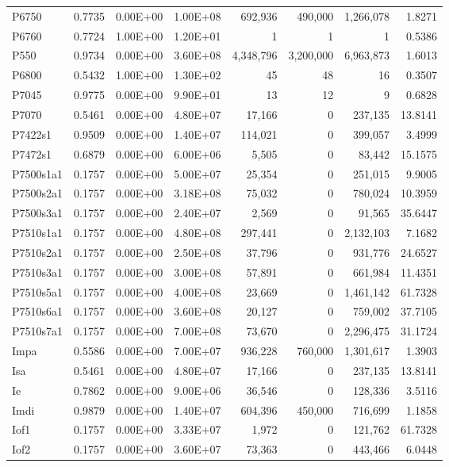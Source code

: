\begin{table}[H]
\begin{tabular}{lrrrrrrr}
P6750 & 0.7735 & 0.00E+00 & 1.00E+08 & 692,936 & 490,000 & 1,266,078 & 1.8271 \\
P6760 & 0.7724 & 1.00E+00 & 1.20E+01 & 1 & 1 & 1 & 0.5386 \\
P550 & 0.9734 & 0.00E+00 & 3.60E+08 & 4,348,796 & 3,200,000 & 6,963,873 & 1.6013 \\
P6800 & 0.5432 & 1.00E+00 & 1.30E+02 & 45 & 48 & 16 & 0.3507 \\
P7045 & 0.9775 & 0.00E+00 & 9.90E+01 & 13 & 12 & 9 & 0.6828 \\
P7070 & 0.5461 & 0.00E+00 & 4.80E+07 & 17,166 & 0 & 237,135 & 13.8141 \\
P7422s1 & 0.9509 & 0.00E+00 & 1.40E+07 & 114,021 & 0 & 399,057 & 3.4999 \\
P7472s1 & 0.6879 & 0.00E+00 & 6.00E+06 & 5,505 & 0 & 83,442 & 15.1575 \\
P7500s1a1 & 0.1757 & 0.00E+00 & 5.00E+07 & 25,354 & 0 & 251,015 & 9.9005 \\
P7500s2a1 & 0.1757 & 0.00E+00 & 3.18E+08 & 75,032 & 0 & 780,024 & 10.3959 \\
P7500s3a1 & 0.1757 & 0.00E+00 & 2.40E+07 & 2,569 & 0 & 91,565 & 35.6447 \\
P7510s1a1 & 0.1757 & 0.00E+00 & 4.80E+08 & 297,441 & 0 & 2,132,103 & 7.1682 \\
P7510s2a1 & 0.1757 & 0.00E+00 & 2.50E+08 & 37,796 & 0 & 931,776 & 24.6527 \\
P7510s3a1 & 0.1757 & 0.00E+00 & 3.00E+08 & 57,891 & 0 & 661,984 & 11.4351 \\
P7510s5a1 & 0.1757 & 0.00E+00 & 4.00E+08 & 23,669 & 0 & 1,461,142 & 61.7328 \\
P7510s6a1 & 0.1757 & 0.00E+00 & 3.60E+08 & 20,127 & 0 & 759,002 & 37.7105 \\
P7510s7a1 & 0.1757 & 0.00E+00 & 7.00E+08 & 73,670 & 0 & 2,296,475 & 31.1724 \\
Impa & 0.5586 & 0.00E+00 & 7.00E+07 & 936,228 & 760,000 & 1,301,617 & 1.3903 \\
Isa & 0.5461 & 0.00E+00 & 4.80E+07 & 17,166 & 0 & 237,135 & 13.8141 \\
Ie & 0.7862 & 0.00E+00 & 9.00E+06 & 36,546 & 0 & 128,336 & 3.5116 \\
Imdi & 0.9879 & 0.00E+00 & 1.40E+07 & 604,396 & 450,000 & 716,699 & 1.1858 \\
Iof1 & 0.1757 & 0.00E+00 & 3.33E+07 & 1,972 & 0 & 121,762 & 61.7328 \\
Iof2 & 0.1757 & 0.00E+00 & 3.60E+07 & 73,363 & 0 & 443,466 & 6.0448 \\

\end{tabular}
\end{table}
